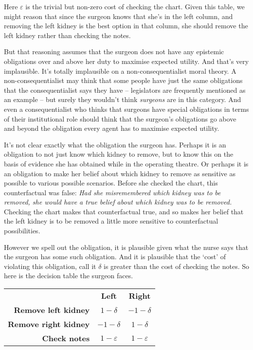 \noindent Here $\varepsilon$ is the trivial but non-zero cost of checking the chart. Given this table, we might reason that since the surgeon knows that she's in the left column, and removing the left kidney is the best option in that column, she should remove the left kidney rather than checking the notes.

But that reasoning assumes that the surgeon does not have any epistemic obligations over and above her duty to maximise expected utility. And that's very implausible. It's totally implausible on a non-consequentialist moral theory. A non-consequentialist may think that some people have just the same obligations that the consequentialist says they have -- legislators are frequently mentioned as an example -- but surely they wouldn't think \textit{surgeons} are in this category. And even a consequentialist who thinks that surgeons have special obligations in terms of their institutional role should think that the surgeon's obligations go above and beyond the obligation every agent has to maximise expected utility.

It's not clear exactly what the obligation the surgeon has. Perhaps it is an obligation to not just know which kidney to remove, but to know this on the basis of evidence she has obtained while in the operating theatre. Or perhaps it is an obligation to make her belief about which kidney to remove as sensitive as possible to various possible scenarios. Before she checked the chart, this counterfactual was false: \textit{Had she misremembered which kidney was to be removed, she would have a true belief about which kidney was to be removed.} Checking the chart makes that counterfactual true, and so makes her belief that the left kidney is to be removed a little more sensitive to counterfactual possibilities. 

However we spell out the obligation, it is plausible given what the nurse says that the surgeon has some such obligation. And it is plausible that the `cost' of violating this obligation, call it $\delta$ is greater than the cost of checking the notes. So here is the decision table the surgeon faces.

\begin{center}
\begin{tabular}{r c c}
 & \textbf{Left} & \textbf{Right} \\
\textbf{Remove left kidney} & $1-\delta$ & $-1-\delta$ \\
\textbf{Remove right kidney} & $-1-\delta$ & $1-\delta$ \\
\textbf{Check notes} & $1-\varepsilon$ & $1-\varepsilon$ \\
\end{tabular}
\end{center}

